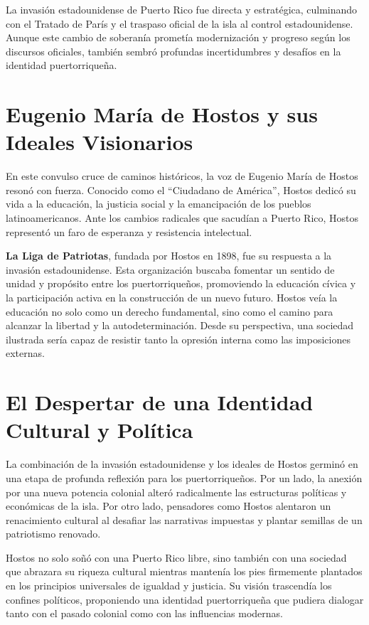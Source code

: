 \documentclass[
]{book}
\begin{document}
La invasión estadounidense de Puerto Rico fue directa y estratégica, culminando con el Tratado de París y el traspaso oficial de la isla al control estadounidense. Aunque este cambio de soberanía prometía modernización y progreso según los discursos oficiales, también sembró profundas incertidumbres y desafíos en la identidad puertorriqueña.

\section{Eugenio María de Hostos y sus Ideales Visionarios}\label{eugenio-maruxeda-de-hostos-y-sus-ideales-visionarios}

En este convulso cruce de caminos históricos, la voz de Eugenio María de Hostos resonó con fuerza. Conocido como el ``Ciudadano de América'', Hostos dedicó su vida a la educación, la justicia social y la emancipación de los pueblos latinoamericanos. Ante los cambios radicales que sacudían a Puerto Rico, Hostos representó un faro de esperanza y resistencia intelectual.

\textbf{La Liga de Patriotas}, fundada por Hostos en 1898, fue su respuesta a la invasión estadounidense. Esta organización buscaba fomentar un sentido de unidad y propósito entre los puertorriqueños, promoviendo la educación cívica y la participación activa en la construcción de un nuevo futuro. Hostos veía la educación no solo como un derecho fundamental, sino como el camino para alcanzar la libertad y la autodeterminación. Desde su perspectiva, una sociedad ilustrada sería capaz de resistir tanto la opresión interna como las imposiciones externas.

\section{El Despertar de una Identidad Cultural y Política}\label{el-despertar-de-una-identidad-cultural-y-poluxedtica}

La combinación de la invasión estadounidense y los ideales de Hostos germinó en una etapa de profunda reflexión para los puertorriqueños. Por un lado, la anexión por una nueva potencia colonial alteró radicalmente las estructuras políticas y económicas de la isla. Por otro lado, pensadores como Hostos alentaron un renacimiento cultural al desafiar las narrativas impuestas y plantar semillas de un patriotismo renovado.

Hostos no solo soñó con una Puerto Rico libre, sino también con una sociedad que abrazara su riqueza cultural mientras mantenía los pies firmemente plantados en los principios universales de igualdad y justicia. Su visión trascendía los confines políticos, proponiendo una identidad puertorriqueña que pudiera dialogar tanto con el pasado colonial como con las influencias modernas.
\end{document}
